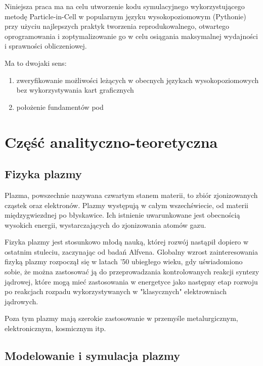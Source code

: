 Niniejsza praca ma na celu utworzenie kodu symulacyjnego wykorzystującego metodę Particle-in-Cell w popularnym języku
wysokopoziomowym (Pythonie) przy użyciu najlepszych praktyk tworzenia reprodukowalnego, otwartego oprogramowania
i zoptymalizowanie go w celu osiągania maksymalnej wydajności i sprawności obliczeniowej.

Ma to dwojaki sens:
\begin{enumerate}
    \item zweryfikowanie możliwości leżących w obecnych językach wysokopoziomowych bez wykorzystywania kart graficznych
    \item położenie fundamentów pod
\end{enumerate}
\section[Część analityczno-teoretyczna]{Część analityczno-teoretyczna} %

\subsection{Fizyka plazmy}

Plazma, powszechnie nazywana czwartym stanem materii, to zbiór zjonizowanych %
cząstek oraz elektronów. Plazmy występują w całym wszechświecie, od materii międzygwiezdnej po błyskawice.
Ich istnienie uwarunkowane jest obecnością wysokich energii, wystarczających do zjonizowania atomów gazu.

Fizyka plazmy jest stosunkowo młodą nauką, której rozwój nastąpił dopiero w ostatnim stuleciu, zaczynając od badań Alfvena. %
Globalny wzrost zainteresowania fizyką plazmy rozpoczął się w latach '50 ubiegłego wieku, %
gdy uświadomiono sobie, że można zastosować ją do przeprowadzania kontrolowanych reakcji syntezy jądrowej, %
które mogą mieć zastosowania w energetyce jako następny etap rozwoju po reakcjach rozpadu wykorzystywanych
w "klasycznych" elektrowniach jądrowych.

Poza tym plazmy mają szerokie zastosowanie w przemyśle metalurgicznym, elektronicznym, kosmicznym itp. %

\subsection{Modelowanie i symulacja plazmy}

